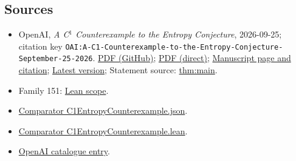 \documentclass[11pt]{article}
\begin{document}
\subsection{Sources}
\begin{itemize}
\item OpenAI, \emph{A C\({}^{1}\) Counterexample to the Entropy Conjecture}, 2026-09-25; citation key \texttt{OAI:A-C1-Counterexample-to-the-Entropy-Conjecture-September-25-2026}. \href{https://github.com/openai/math/blob/adc7f1241b42e322a6451854ab7e4b4c146bf78a/preprints/A-C1-Counterexample-to-the-Entropy-Conjecture-September-25-2026/article.pdf}{PDF (GitHub)}; \href{https://github.com/openai/math/raw/adc7f1241b42e322a6451854ab7e4b4c146bf78a/preprints/A-C1-Counterexample-to-the-Entropy-Conjecture-September-25-2026/article.pdf}{PDF (direct)}; \href{https://github.com/openai/math/blob/adc7f1241b42e322a6451854ab7e4b4c146bf78a/preprints/A-C1-Counterexample-to-the-Entropy-Conjecture-September-25-2026/README.md}{Manuscript page and citation}; \href{https://github.com/openai/math/blob/main/preprints/A-C1-Counterexample-to-the-Entropy-Conjecture-September-25-2026/article.pdf}{Latest version}; Statement source: \href{https://github.com/openai/math/blob/adc7f1241b42e322a6451854ab7e4b4c146bf78a/preprints/A-C1-Counterexample-to-the-Entropy-Conjecture-September-25-2026/build/source/main.tex\#L98}{thm:main}.
\item Family 151: \href{https://github.com/openai/math/blob/adc7f1241b42e322a6451854ab7e4b4c146bf78a/lean/docs/151.md}{Lean scope}.
\item \href{https://github.com/openai/math/blob/adc7f1241b42e322a6451854ab7e4b4c146bf78a/lean/ComparatorChallenges/C1EntropyCounterexample.json}{Comparator C1EntropyCounterexample.json}.
\item \href{https://github.com/openai/math/blob/adc7f1241b42e322a6451854ab7e4b4c146bf78a/lean/ComparatorChallenges/C1EntropyCounterexample.lean}{Comparator C1EntropyCounterexample.lean}.
\item \href{https://github.com/openai/math/blob/adc7f1241b42e322a6451854ab7e4b4c146bf78a/CONTENTS.md}{OpenAI catalogue entry}.
\end{itemize}
\end{document}
